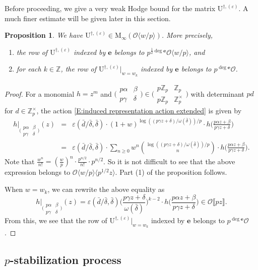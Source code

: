 \documentclass[12pt]{amsart}
\newtheorem{proposition}[subsection]{Proposition}
\theoremstyle{definition}
\numberwithin{equation}{subsection}
\def\calO{\mathcal{O}}
\def\ZZ{\mathbb{Z}}
\def\bfe{\mathbf{e}}
\def\rmM{\mathrm{M}}
\def\rmU{\mathrm{U}}
\newcommand{\Matrix}[4]{{\big(\begin{smallmatrix}#1&#2\\#3& #4\end{smallmatrix} \big)}}
\begin{document}
Before proceeding, we give a very weak Hodge bound for the matrix $\rmU^{\dagger, (\varepsilon)}$.  A much finer estimate will be given later in this section.
\begin{proposition}
\label{P:naive HB}
We have $\rmU^{\dagger, (\varepsilon)} \in \rmM_\infty(\calO\langle w/p\rangle)$. More precisely,
\begin{enumerate}
\item the row of $\rmU^{\dagger, (\varepsilon)}$ indexed by $\bfe$ belongs to $p^{\frac 12\deg \bfe}\calO\langle w/p\rangle$, and
\item for each $k \in \ZZ$, the row of $\rmU^{\dagger,(\varepsilon)}|_{w=w_k}$ indexed by $\bfe$ belongs to $p^{\deg \bfe}\calO$.
\end{enumerate}
\end{proposition}
\begin{proof}
For a monomial $h = z^m$ and $\Matrix {p\alpha} \beta {p\gamma} \delta \in \Matrix{p\ZZ_p}{\ZZ_p}{p\ZZ_p}{\ZZ_p^\times}$ with determinant $pd$ for $d \in \ZZ_p^\times$, the action \eqref{E:induced representation action extended} is given by
\begin{eqnarray*}
h\big|_{\Matrix {p\alpha}\beta{p\gamma}\delta}(z) & = &\varepsilon(\bar d / \bar \delta,\bar \delta) \cdot (1+w)^{\log\left((p\gamma z+\delta )/ \omega(\bar \delta)\right)/p} \cdot h\Big( \frac{p\alpha z+\beta}{p\gamma z+\delta}\Big)
\\
& = &\varepsilon(\bar d / \bar \delta,\bar \delta) \cdot \sum_{n\geq 0}w^n \binom{\log\left((p\gamma z+\delta )/ \omega(\bar \delta)\right)/p}{n} \cdot h\Big( \frac{p\alpha z+\beta}{p\gamma z+\delta}\Big).
\end{eqnarray*}
Note that $\frac{w^n}{n!} = (\frac wp)^n \cdot \frac{p^{n/2}}{n!} \cdot p^{n/2}$.
So it is not difficult to see that the above expression belongs to $\calO\langle w/p\rangle \langle p^{1/2}z\rangle$. Part (1) of the proposition follows.

When $w=w_k$, we can rewrite the above equality as
$$
h\big|_{\Matrix {p\alpha}\beta{p\gamma}\delta}(z) =\varepsilon(\bar d / \bar \delta,\bar \delta)\Big(\frac{p\gamma z+\delta}{\omega(\bar \delta)}\Big)^{k-2} \cdot h\Big( \frac{p\alpha z+\beta}{p\gamma z+\delta}\Big) \in \calO\llbracket pz\rrbracket.
$$
From this, we see that the row of $\rmU^{\dagger,(\varepsilon)}|_{w=w_k}$ indexed by $\bfe$ belongs to $p^{\deg \bfe}\calO$.
\end{proof}

\subsection{$p$-stabilization process}
\label{S:p-stabilization}
\end{document}
